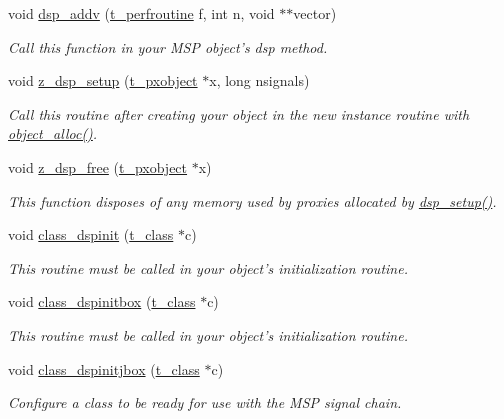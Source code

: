 \begin{DoxyCompactItemize}
void \hyperlink{group__msp_gaf8709cab1b4bbbbd78010f765e83b328}{dsp\_\-addv} (\hyperlink{group__msp_gad1bc58df327774373ee9e10ad9026564}{t\_\-perfroutine} f, int n, void $\ast$$\ast$vector)
\begin{DoxyCompactList}\small\item\em Call this function in your MSP object's dsp method. \item\end{DoxyCompactList}\item 
void \hyperlink{group__msp_ga5c4d70cfb420f13386dd1473143e5825}{z\_\-dsp\_\-setup} (\hyperlink{structt__pxobject}{t\_\-pxobject} $\ast$x, long nsignals)
\begin{DoxyCompactList}\small\item\em Call this routine after creating your object in the new instance routine with \hyperlink{group__obj_gacb89ef27c34b45e9037d877375804284}{object\_\-alloc()}. \item\end{DoxyCompactList}\item 
void \hyperlink{group__msp_ga85762f03c915d3860f526a8bf4dd1f3f}{z\_\-dsp\_\-free} (\hyperlink{structt__pxobject}{t\_\-pxobject} $\ast$x)
\begin{DoxyCompactList}\small\item\em This function disposes of any memory used by proxies allocated by \hyperlink{group__msp_gad15f054306792846a00a5f4e9e5426be}{dsp\_\-setup()}. \item\end{DoxyCompactList}\item 
void \hyperlink{group__msp_ga7427ae73a2ad71a1b4ef1bee2fd432fc}{class\_\-dspinit} (\hyperlink{structt__class}{t\_\-class} $\ast$c)
\begin{DoxyCompactList}\small\item\em This routine must be called in your object's initialization routine. \item\end{DoxyCompactList}\item 
void \hyperlink{group__msp_gab2b27239f91fdd5bcc2bac299081687f}{class\_\-dspinitbox} (\hyperlink{structt__class}{t\_\-class} $\ast$c)
\begin{DoxyCompactList}\small\item\em This routine must be called in your object's initialization routine. \item\end{DoxyCompactList}\item 
void \hyperlink{group__msp_gab9219b764ce65abb21bec0ea54538c14}{class\_\-dspinitjbox} (\hyperlink{structt__class}{t\_\-class} $\ast$c)
\begin{DoxyCompactList}\small\item\em Configure a class to be ready for use with the MSP signal chain. \item\end{DoxyCompactList}\end{DoxyCompactItemize}


